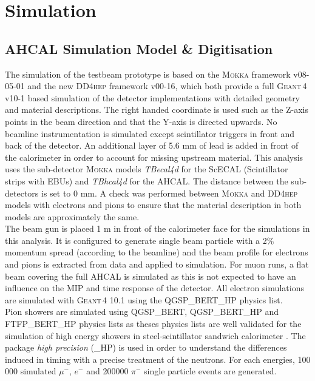 \documentclass[twoside,a4paper,11pt]{article}
\newcommand\geant{\textsc{Geant\,4}\xspace}
\newcommand\mokka{\textsc{Mokka}\xspace}
\newcommand\ddhep{\textsc{DD4hep}\xspace}
\begin{document}
\section{Simulation}

\subsection{AHCAL Simulation Model \& Digitisation}

The simulation of the testbeam prototype is based on the \mokka framework v08-05-01 and the new \ddhep framework v00-16, which both provide a full \geant v10-1 based simulation of the detector implementations with detailed geometry and material descriptions. The right handed coordinate is used such as the Z-axis points in the beam direction and that the Y-axis is directed upwards. No beamline instrumentation is simulated except scintillator triggers in front and back of the detector. An additional layer of 5.6 mm of lead is added in front of the calorimeter in order to account for missing upstream material. This analysis uses the sub-detector \mokka models \textit{TBecal4d} for the ScECAL (Scintillator strips with EBUs) and \textit{TBhcal4d} for the AHCAL. The distance between the sub-detectors is set to 0 mm. A check was performed between \mokka and \ddhep models with electrons and pions to ensure that the material description in both models are approximately the same.\\
The beam gun is placed 1 m in front of the calorimeter face for the simulations in this analysis. It is configured to generate single beam particle with a 2\% momentum spread (according to the beamline) and the beam profile for electrons and pions is extracted from data and applied to simulation. For muon runs, a flat beam covering the full AHCAL is simulated as this is not expected to have an influence on the MIP and time response of the detector.
All electron simulations are simulated with \geant 10.1 using the QGSP\_BERT\_HP physics list.\\
Pion showers are simulated using QGSP\_BERT, QGSP\_BERT\_HP and FTFP\_BERT\_HP physics lists as theses physics lists are well validated for the simulation of high energy showers in steel-scintillator sandwich calorimeter \cite{AHCAL_Physics}. The package \textit{high precision} (\_HP) is used in order to understand the differences induced in timing with a precise treatment of the neutrons.
For each energies, 100 000 simulated $\mu^-$, $e^-$ and 200000 $\pi^-$ single particle events are generated.\\
\end{document}
